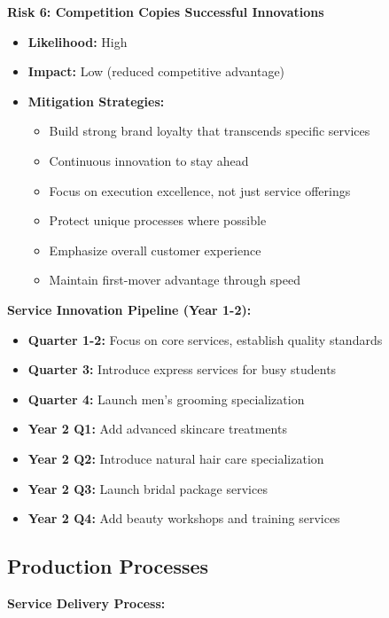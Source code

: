 \textbf{Risk 6: Competition Copies Successful Innovations}
\begin{itemize}[leftmargin=2em]
    \item \textbf{Likelihood:} High
    \item \textbf{Impact:} Low (reduced competitive advantage)
    \item \textbf{Mitigation Strategies:}
    \begin{itemize}
        \item Build strong brand loyalty that transcends specific services
        \item Continuous innovation to stay ahead
        \item Focus on execution excellence, not just service offerings
        \item Protect unique processes where possible
        \item Emphasize overall customer experience
        \item Maintain first-mover advantage through speed
    \end{itemize}
\end{itemize}

\vspace{1em}

\textbf{Service Innovation Pipeline (Year 1-2):}
\begin{itemize}[leftmargin=2em]
    \item \textbf{Quarter 1-2:} Focus on core services, establish quality standards
    \item \textbf{Quarter 3:} Introduce express services for busy students
    \item \textbf{Quarter 4:} Launch men's grooming specialization
    \item \textbf{Year 2 Q1:} Add advanced skincare treatments
    \item \textbf{Year 2 Q2:} Introduce natural hair care specialization
    \item \textbf{Year 2 Q3:} Launch bridal package services
    \item \textbf{Year 2 Q4:} Add beauty workshops and training services
\end{itemize}

\subsection{Production Processes}

\textbf{Service Delivery Process:}

